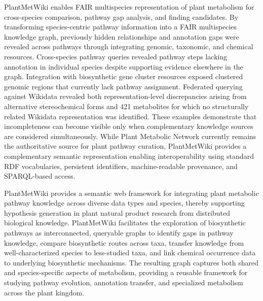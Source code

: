 \documentclass[11pt,a4paper]{article}
\begin{document}
PlantMetWiki enables FAIR multispecies representation of plant metabolism for cross-species comparison, pathway gap analysis, and finding candidates. By transforming species-centric pathway information into a FAIR multispecies knowledge graph, previously hidden relationships and annotation gaps were revealed across pathways through integrating genomic, taxonomic, and chemical resources. Cross-species pathway queries revealed pathway steps lacking
annotation in individual species despite supporting evidence elsewhere in the graph. Integration with
biosynthetic gene cluster resources exposed clustered genomic regions that currently lack pathway
assignment. Federated querying against Wikidata revealed both representation-level discrepancies
arising from alternative stereochemical forms and 421 metabolites for which no structurally related
Wikidata representation was identified. These examples demonstrate that incompleteness can become visible
only when complementary knowledge sources are considered simultaneously. 
While Plant Metabolic Network currently remains the authoritative source for plant pathway
curation, PlantMetWiki provides a complementary semantic representation enabling
interoperability using standard RDF vocabularies, persistent identifiers,
machine-readable provenance, and SPARQL-based access. 

PlantMetWiki provides a semantic web framework for integrating plant metabolic pathway knowledge across
diverse data types and species, thereby supporting hypothesis generation in plant natural
product research from distributed biological knowledge. PlantMetWiki facilitates the exploration of
biosynthetic pathways as interconnected, queryable graphs to identify gaps in pathway knowledge, compare biosynthetic routes
across taxa, transfer knowledge from well-characterized species to less-studied taxa, and link
chemical occurrence data to underlying biosynthetic mechanisms. The resulting graph captures both
shared and species-specific aspects of metabolism, providing a reusable framework for studying
pathway evolution, annotation transfer, and specialized metabolism across the plant kingdom. 
\end{document}
